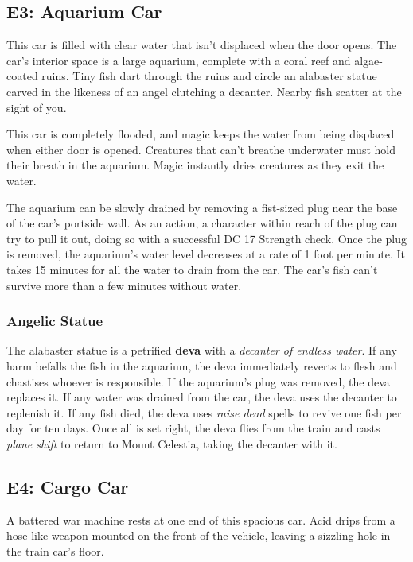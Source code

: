 \documentclass[10pt,a4paper,twoside,bg=print,twocolumn,openany,nodeprecatedcode]{dndarticle}
\begin{document}
\subsection{E3: Aquarium Car}
\begin{DndReadAloud}{}
This car is filled with clear water that isn't displaced when the door opens. The car's interior space is a large aquarium, complete with a coral reef and algae-coated ruins. Tiny fish dart through the ruins and circle an alabaster statue carved in the likeness of an angel clutching a decanter. Nearby fish scatter at the sight of you.

\end{DndReadAloud}

This car is completely flooded, and magic keeps the water from being displaced when either door is opened. Creatures that can't breathe underwater must hold their breath in the aquarium. Magic instantly dries creatures as they exit the water.

The aquarium can be slowly drained by removing a fist-sized plug near the base of the car's portside wall. As an action, a character within reach of the plug can try to pull it out, doing so with a successful DC 17 Strength check. Once the plug is removed, the aquarium's water level decreases at a rate of 1 foot per minute. It takes 15 minutes for all the water to drain from the car. The car's fish can't survive more than a few minutes without water.

\subsubsection{Angelic Statue}
The alabaster statue is a petrified \textbf{deva} with a \textit{decanter of endless water}. If any harm befalls the fish in the aquarium, the deva immediately reverts to flesh and chastises whoever is responsible. If the aquarium's plug was removed, the deva replaces it. If any water was drained from the car, the deva uses the decanter to replenish it. If any fish died, the deva uses \textit{raise dead} spells to revive one fish per day for ten days. Once all is set right, the deva flies from the train and casts \textit{plane shift} to return to Mount Celestia, taking the decanter with it.

\subsection{E4: Cargo Car}
\begin{DndReadAloud}{}
A battered war machine rests at one end of this spacious car. Acid drips from a hose-like weapon mounted on the front of the vehicle, leaving a sizzling hole in the train car's floor.

\end{DndReadAloud}
\end{document}
